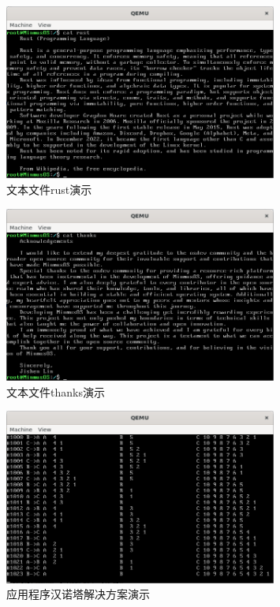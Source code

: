 \begin{figure}[htbp]
    \centering
    \includegraphics[width=0.8\textwidth]{figures/RustFilePresentation.png}
    \caption{文本文件rust演示}
\end{figure}

\begin{figure}[htbp]
    \centering
    \includegraphics[width=0.8\textwidth]{figures/ThanksFilePresentation.png}
    \caption{文本文件thanks演示}
\end{figure}

\begin{figure}[htbp]
    \centering
    \includegraphics[width=0.8\textwidth]{figures/ApplicationHanoiPresentation.png}
    \caption{应用程序汉诺塔解决方案演示}
\end{figure}


